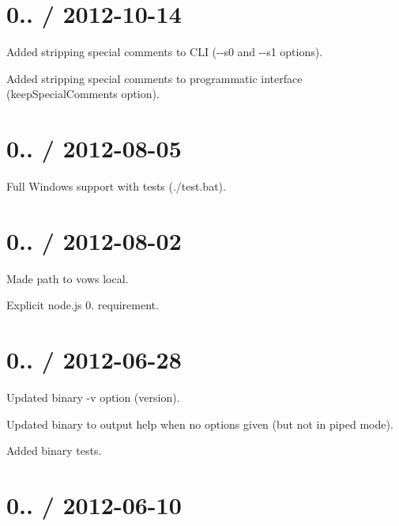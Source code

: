 \section*{0.. / 2012-\/10-\/14 }


\begin{DoxyItemize}
\item Added stripping special comments to C\+LI ({\ttfamily -\/-\/s0} and {\ttfamily -\/-\/s1} options).
\item Added stripping special comments to programmatic interface ({\ttfamily keep\+Special\+Comments} option).
\end{DoxyItemize}

\section*{0.. / 2012-\/08-\/05 }


\begin{DoxyItemize}
\item Full Windows support with tests (./test.bat).
\end{DoxyItemize}

\section*{0.. / 2012-\/08-\/02 }


\begin{DoxyItemize}
\item Made path to vows local.
\item Explicit node.\+js 0. requirement.
\end{DoxyItemize}

\section*{0.. / 2012-\/06-\/28 }


\begin{DoxyItemize}
\item Updated binary {\ttfamily -\/v} option (version).
\item Updated binary to output help when no options given (but not in piped mode).
\item Added binary tests.
\end{DoxyItemize}

\section*{0.. / 2012-\/06-\/10 }



